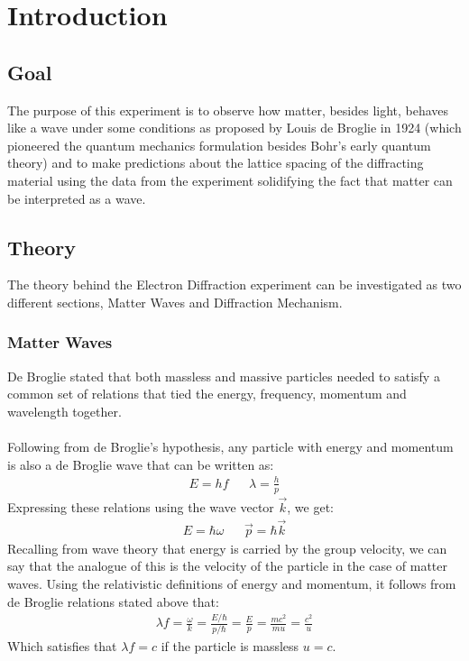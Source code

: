 \section{Introduction}

	\subsection{Goal}
		The purpose of this experiment is to observe how matter, besides light, behaves like a wave under some conditions as proposed by Louis de Broglie in 1924 (which pioneered the quantum mechanics formulation besides Bohr's early quantum theory) and to make predictions about the lattice spacing of the diffracting material using the data from the experiment solidifying the fact that matter can be interpreted as a wave.  
	\subsection{Theory}
		The theory behind the Electron Diffraction experiment can be investigated as two different sections, Matter Waves and Diffraction Mechanism.
		\subsubsection{Matter Waves}
			De Broglie stated that both massless and massive particles needed to satisfy a common set of relations that tied the energy, frequency, momentum and wavelength together. 
			\\
			\\
			Following from de Broglie's hypothesis, any particle with energy and momentum is also a de Broglie wave that can be written as:
			\begin{align*}
				E = h f && \lambda = \frac{h}{p}
			\end{align*}
			Expressing these relations using the wave vector $\vec{k}$, we get:
			\begin{align*}
				E = \hbar \omega && \vec{p} = \hbar \vec{k}
			\end{align*}
			Recalling from wave theory that energy is carried by the group velocity, we can say that the analogue of this is the velocity of the particle in the case of matter waves. Using the relativistic definitions of energy and momentum, it follows from de Broglie relations stated above that:
			\begin{align*}
				\lambda f = \frac{\omega}{k} = \frac{E / \hbar}{p / \hbar} = \frac{E}{p} = \frac{m c^2}{m u} = \frac{c^2}{u}
			\end{align*}
		Which satisfies that $\lambda f = c$ if the particle is massless $u = c$. 
